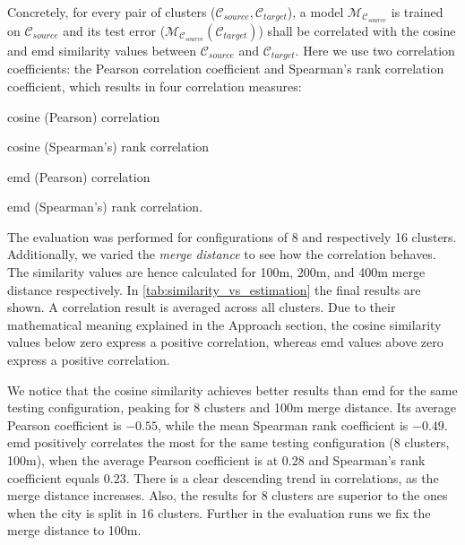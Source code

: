 \documentclass{ws-ijait}
\newcommand{\cmmnt}[1]{\ignorespaces}
\begin{document}
	Concretely, for every pair of clusters ($\mathcal{C}_{source}, \mathcal{C}_{target}$), a model $\mathcal{M}_{\mathcal{C}_{source}}$ is trained on $\mathcal{C}_{source}$ and its test error ($\mathcal{M}_{\mathcal{C}_{source}}(\mathcal{C}_{target})$) shall be correlated with the cosine and emd similarity values between $\mathcal{C}_{source}$ and $\mathcal{C}_{target}$. Here we use two correlation coefficients: the Pearson correlation coefficient and Spearman's rank correlation coefficient, which results in four correlation measures: 
	\begin{romanlist}
		\item	cosine (Pearson) correlation
		\item 	cosine (Spearman's) rank correlation
		\item 	emd (Pearson) correlation
		\item 	emd (Spearman's) rank correlation. 
	\end{romanlist}
	The evaluation was performed for configurations of 8 and respectively 16 clusters. Additionally, we varied the \textit{merge distance} to see how the correlation behaves. The similarity values are hence calculated for 100m, 200m, and 400m merge distance respectively. In \cref{tab:similarity_vs_estimation} the final results are shown. A correlation result is averaged across all clusters. Due to their mathematical meaning explained in \cmmnt{\cref{realization:similarity_functions}} the Approach section, the cosine similarity values below zero express a positive correlation, whereas emd values above zero express a positive correlation. 
	
	We notice that the cosine similarity achieves better results than emd for the same testing configuration, peaking for 8 clusters and 100m merge distance. Its average Pearson coefficient is $-0.55$, while the mean Spearman rank coefficient is $-0.49$. emd positively correlates the most for the same testing configuration (8 clusters, 100m), when the average Pearson coefficient is at $0.28$ and Spearman's rank coefficient equals $0.23$. There is a clear descending trend in correlations, as the merge distance increases.  Also, the results for 8 clusters are superior to the ones when the city is split in 16 clusters. Further in the evaluation runs we fix the merge distance to 100m.
	
\end{document}
